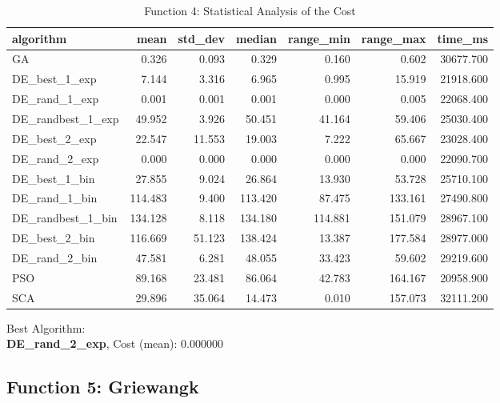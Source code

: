 \documentclass[12pt]{article}
\begin{document}
\begin{table}[H]
    \centering
    \footnotesize
\begin{tabular}{lrrrrrr}
\toprule
         algorithm &    mean &  std\_dev &  median &  range\_min &  range\_max &   time\_ms \\
\midrule
                GA &   0.326 &    0.093 &   0.329 &      0.160 &      0.602 & 30677.700 \\
     DE\_best\_1\_exp &   7.144 &    3.316 &   6.965 &      0.995 &     15.919 & 21918.600 \\
     DE\_rand\_1\_exp &   0.001 &    0.001 &   0.001 &      0.000 &      0.005 & 22068.400 \\
 DE\_randbest\_1\_exp &  49.952 &    3.926 &  50.451 &     41.164 &     59.406 & 25030.400 \\
     DE\_best\_2\_exp &  22.547 &   11.553 &  19.003 &      7.222 &     65.667 & 23028.400 \\
     DE\_rand\_2\_exp &   0.000 &    0.000 &   0.000 &      0.000 &      0.000 & 22090.700 \\
     DE\_best\_1\_bin &  27.855 &    9.024 &  26.864 &     13.930 &     53.728 & 25710.100 \\
     DE\_rand\_1\_bin & 114.483 &    9.400 & 113.420 &     87.475 &    133.161 & 27490.800 \\
 DE\_randbest\_1\_bin & 134.128 &    8.118 & 134.180 &    114.881 &    151.079 & 28967.100 \\
     DE\_best\_2\_bin & 116.669 &   51.123 & 138.424 &     13.387 &    177.584 & 28977.000 \\
     DE\_rand\_2\_bin &  47.581 &    6.281 &  48.055 &     33.423 &     59.602 & 29219.600 \\
               PSO &  89.168 &   23.481 &  86.064 &     42.783 &    164.167 & 20958.900 \\
               SCA &  29.896 &   35.064 &  14.473 &      0.010 &    157.073 & 32111.200 \\
\bottomrule
\end{tabular}

\caption{Function 4: Statistical Analysis of the Cost} 
    \end{table}
Best Algorithm: \\
\textbf{DE\_rand\_2\_exp}, Cost (mean): 0.000000\\
\newpage
\subsection{Function 5: Griewangk}
\end{document}
